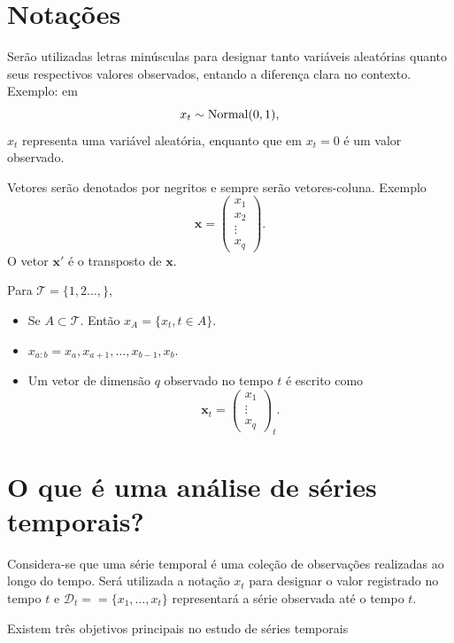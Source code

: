 \documentclass[
  letterpaper,
  DIV=11,
  numbers=noendperiod]{scrreprt}
\providecommand{\tightlist}{%
  \setlength{\itemsep}{0pt}\setlength{\parskip}{0pt}}\usepackage{longtable,booktabs,array}
\theoremstyle{definition}
\theoremstyle{plain}
\theoremstyle{definition}
\theoremstyle{plain}
\theoremstyle{remark}
\begin{document}
\hypertarget{notauxe7uxf5es}{%
\section{Notações}\label{notauxe7uxf5es}}

Serão utilizadas letras minúsculas para designar tanto variáveis
aleatórias quanto seus respectivos valores observados, entando a
diferença clara no contexto. Exemplo: em \[x_t\sim\hbox{Normal}(0,1),\]
\(x_t\) representa uma variável aleatória, enquanto que em \(x_t=0\) é
um valor observado.

Vetores serão denotados por negritos e sempre serão vetores-coluna.
Exemplo
\[\boldsymbol{x}=\left(\begin{array}{c}x_1 \\ x_2 \\ \vdots \\ x_q\end{array}\right).\]
O vetor \(\boldsymbol{x}'\) é o transposto de \(\boldsymbol{x}\).

Para \(\mathcal{T}=\{1,2\ldots,\}\),

\begin{itemize}
\tightlist
\item
  Se \(A\subset\mathcal{T}\). Então \(x_A=\{x_{t},t\in A\}\).
\item
  \(x_{a:b}=x_a,x_{a+1},\ldots,x_{b-1},x_{b}.\)
\item
  Um vetor de dimensão \(q\) observado no tempo \(t\) é escrito como
  \[\boldsymbol{x}_t =\left(\begin{array}{c}x_{1} \\ \vdots \\ x_{q}\end{array}\right)_{t}.\]
\end{itemize}

\hypertarget{o-que-uxe9-uma-anuxe1lise-de-suxe9ries-temporais}{%
\section{O que é uma análise de séries
temporais?}\label{o-que-uxe9-uma-anuxe1lise-de-suxe9ries-temporais}}

Considera-se que uma série temporal é uma coleção de observações
realizadas ao longo do tempo. Será utilizada a notação \(x_t\) para
designar o valor registrado no tempo \(t\) e
\(\mathcal{D}_t==\{x_1,\ldots,x_t\}\) representará a série observada até
o tempo \(t\).

Existem três objetivos principais no estudo de séries temporais
\end{document}
